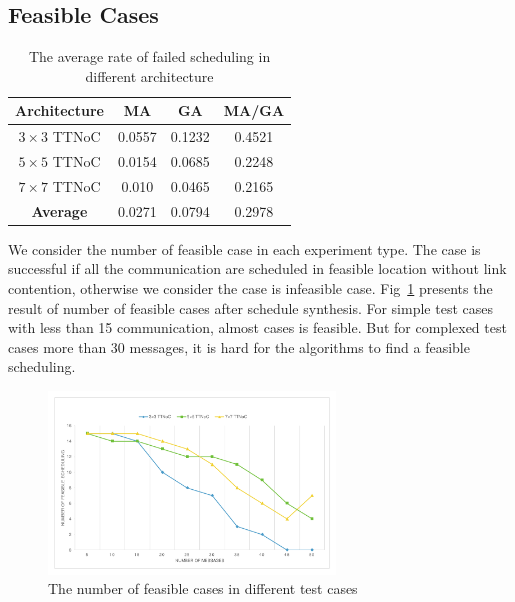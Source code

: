 \documentclass[journal]{IEEEtran}
\begin{document}
\subsection{Feasible Cases}
\begin{table}[!t]
	\renewcommand{\arraystretch}{1.3}
	\caption{The average rate of failed scheduling in different architecture }
	\label{t:performance}
	\centering
	\begin{tabular}{|c||c||c||c|}
		\hline
		\textbf{Architecture} & \textbf{MA} &\textbf{GA} & \textbf{MA/GA}\\
		\hline 
		$3\times 3$ TTNoC&0.0557& 0.1232&	0.4521		
		\\
		\hline
		$5\times 5$ TTNoC& 0.0154	& 0.0685&0.2248\\
		\hline
		$7\times 7$ TTNoC& 0.010& 	0.0465&	0.2165\\
		\hline		
		\hline
		\textbf{Average }& 	0.0271 &0.0794&0.2978\\
		\hline
	\end{tabular}	
\end{table}
We consider the number of feasible case in each experiment type.
The case is successful if all the communication are scheduled in feasible location without link contention,
 otherwise we consider the case is infeasible case.
Fig~\ref{f:feasible} presents the result of number of feasible cases after schedule synthesis.
For simple test cases with less than 15 communication,
 almost cases is feasible.
But for complexed test cases more than 30 messages, it is hard for the algorithms to find a feasible scheduling.
\begin{figure}[!t]
	\centering
	\includegraphics[width=3in]{picture/feasible_case}
	\caption{The number of feasible cases in different test cases}
	\label{f:feasible}
\end{figure}
\end{document}
